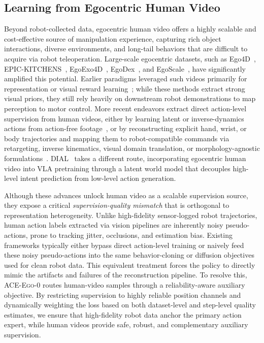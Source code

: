 \documentclass{llmxive}
\providecommand{\OURS}{\textsc{ACE-Ego-0}\xspace}
\providecommand{\Ours}{\OURS}
\begin{document}
\subsection{Learning from Egocentric Human Video}
Beyond robot-collected data, egocentric human video offers a highly scalable and cost-effective source of manipulation experience, capturing rich object interactions, diverse environments, and long-tail behaviors that are difficult to acquire via robot teleoperation. Large-scale egocentric datasets, such as Ego4D~\cite{grauman2022ego4d}, EPIC-KITCHENS~\cite{damen2022epickitchens}, EgoExo4D~\cite{grauman2024egoexo4d}, EgoDex~\cite{hoque2025egodex}, and EgoScale~\cite{zheng2026egoscale}, have significantly amplified this potential. 
Earlier paradigms leveraged such videos primarily for representation or visual reward learning~\cite{nair2022r3m,ma2022vip,ma2023liv,xiao2022mvp,majumdar2023vc1,karamcheti2023voltron,lin2022egovlp,zhao2023lavila}; while these methods extract strong visual priors, they still rely heavily on downstream robot demonstrations to map perception to motor control. 
More recent endeavors extract direct action-level supervision from human videos, either by learning latent or inverse-dynamics actions from action-free footage~\cite{ye2025lapa}, or by reconstructing explicit hand, wrist, or body trajectories and mapping them to robot-compatible commands via retargeting, inverse kinematics, visual domain translation, or morphology-agnostic formulations~\cite{fu2024humanplus,li2024okami,kareer2024egomimic,lepert2025phantom,yang2025egovla,zhu2025emma,li2025h2r,liu2025egozero,bharadhwaj2025zeromimic}.
DIAL~\cite{chen2026dial} takes a different route, incorporating egocentric human video into VLA pretraining through a latent world model that decouples high-level intent prediction from low-level action generation.


Although these advances unlock human video as a scalable supervision source, they expose a critical \emph{supervision-quality mismatch} that is orthogonal to representation heterogeneity. Unlike high-fidelity sensor-logged robot trajectories, human action labels extracted via vision pipelines are inherently noisy pseudo-actions, prone to tracking jitter, occlusions, and estimation bias. 
Existing frameworks typically either bypass direct action-level training or naively feed these noisy pseudo-actions into the same behavior-cloning or diffusion objectives used for clean robot data. This equivalent treatment forces the policy to directly mimic the artifacts and failures of the reconstruction pipeline. 
To resolve this, \Ours routes human-video samples through a reliability-aware auxiliary objective. By restricting supervision to highly reliable position channels and dynamically weighting the loss based on both dataset-level and step-level quality estimates, we ensure that high-fidelity robot data anchor the primary action expert, while human videos provide safe, robust, and complementary auxiliary supervision.
\end{document}
